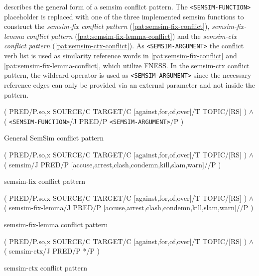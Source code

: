 \documentclass[11pt]{scrreprt}
\begin{document}
 describes the general form of a semsim conflict pattern. The \texttt{<SEMSIM-FUNCTION>} placeholder is replaced with one of the three implemented semsim functions to construct the \textit{semsim-fix conflict pattern} (\cref{pat:semsim-fix-conflict}), \textit{semsim-fix-lemma conflict pattern} (\cref{pat:semsim-fix-lemma-conflict}) and the \textit{semsim-ctx conflict pattern} (\cref{pat:semsim-ctx-conflict}). As \texttt{<SEMSIM-ARGUMENT>} the conflict verb list is used as similarity reference words in \cref{pat:semsim-fix-conflict} and \cref{pat:semsim-fix-lemma-conflict}, which utilize FNESS. In the semsim-ctx conflict pattern, the wildcard operator is used as \texttt{<SEMSIM-ARGUMENT>} since the necessary reference edges can only be provided via an external parameter and not inside the pattern.


\begin{pattern}[H]
  \normalfont\sffamily
  \centering
  ( PRED/P.{so,x} SOURCE/C TARGET/C [against,for,of,over]/T TOPIC/[RS] ) \(\wedge\)\\ 
  ( \texttt{<SEMSIM-FUNCTION>}/J PRED/P \texttt{<SEMSIM-ARGUMENT>}/P )
  \caption{General SemSim conflict pattern}
  \label{pat:semsim-conflict}
\end{pattern}

\begin{pattern}[H]
  \normalfont\sffamily
  \centering
  ( PRED/P.{so,x} SOURCE/C TARGET/C [against,for,of,over]/T TOPIC/[RS] ) \(\wedge\)\\ 
  ( semsim/J PRED/P [accuse,arrest,clash,condemn,kill,slam,warn]//P )
  \caption{semsim-fix conflict pattern}
  \label{pat:semsim-fix-conflict}
\end{pattern}

\begin{pattern}[H]
  \normalfont\sffamily
  \centering
  ( PRED/P.{so,x} SOURCE/C TARGET/C [against,for,of,over]/T TOPIC/[RS] ) \(\wedge\)\\ 
  ( semsim-fix-lemma/J PRED/P [accuse,arrest,clash,condemn,kill,slam,warn]//P )
  \caption{semsim-fix-lemma conflict pattern}
  \label{pat:semsim-fix-lemma-conflict}
\end{pattern}

\begin{pattern}[H]
  \normalfont\sffamily
  \centering
  ( PRED/P.{so,x} SOURCE/C TARGET/C [against,for,of,over]/T TOPIC/[RS] ) \(\wedge\)\\ 
  ( semsim-ctx/J PRED/P */P )
  \caption{semsim-ctx conflict pattern}
  \label{pat:semsim-ctx-conflict}
\end{pattern}
\end{document}

